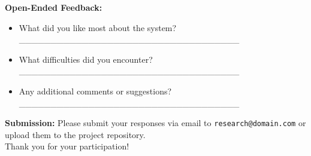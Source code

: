\documentclass[12pt, titlepage]{article}
\begin{document}
\textbf{Open-Ended Feedback:}
\begin{itemize}
    \item What did you like most about the system?
    \newline\_\_\_\_\_\_\_\_\_\_\_\_\_\_\_\_\_\_\_\_\_\_\_\_\_\_\_\_\_\_\_\_\_\_\_
    \item What difficulties did you encounter?
    \newline\_\_\_\_\_\_\_\_\_\_\_\_\_\_\_\_\_\_\_\_\_\_\_\_\_\_\_\_\_\_\_\_\_\_\_
    \item Any additional comments or suggestions?
    \newline\_\_\_\_\_\_\_\_\_\_\_\_\_\_\_\_\_\_\_\_\_\_\_\_\_\_\_\_\_\_\_\_\_\_\_
\end{itemize}

\textbf{Submission:}
Please submit your responses via email to \texttt{research@domain.com} or upload them to the project repository.\\

Thank you for your participation!
\end{document}

